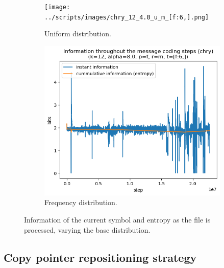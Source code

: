 \documentclass{article}
\begin{document}
\begin{figure}
    \begin{subfigure}[b]{0.45\textwidth}
        \begin{center}
            \texttt{[image: ../scripts/images/chry\_12\_4.0\_u\_m\_[f:6,].png]}
        \end{center}
        \caption{Uniform distribution.}
        \label{fig:results-distribution-uniform}
    \end{subfigure}
    \hfill
    \begin{subfigure}[b]{0.45\textwidth}
        \begin{center}
            \includegraphics[width=1.0\linewidth]{../scripts/images/chry_12_8.0_f_m_[f:6,].png}
        \end{center}
        \caption{Frequency distribution.}
        \label{fig:results-distribution-frequency}
    \end{subfigure}
    \caption{Information of the current symbol and entropy as the file is processed, varying the base distribution.}
    \label{fig:results-distribution}
\end{figure}

\subsection{Copy pointer repositioning strategy}
\end{document}
